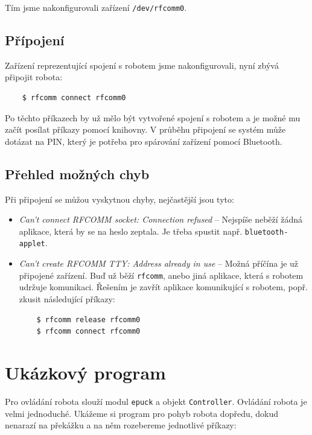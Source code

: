 \documentclass[12pt,notitlepage]{report}
\begin{document}
    Tím jsme nakonfigurovali zařízení {\tt /dev/rfcomm0}.

    \subsection{Přípojení}

    Zařízení reprezentující spojení s robotem jsme nakonfigurovali, nyní zbývá
    připojit robota:

    \begin{verbatim}
    $ rfcomm connect rfcomm0
    \end{verbatim}

    Po těchto příkazech by už mělo být vytvořené spojení s robotem a je možné
    mu začít posílat příkazy pomocí knihovny. V průběhu připojení se systém
    může dotázat na PIN, který je potřeba pro spárování zařízení pomocí
    Bluetooth.

    \subsection{Přehled možných chyb}
    Při připojení se můžou vyskytnou chyby, nejčastější jsou tyto:
    \begin{itemize}
    \item{{\em Can't connect RFCOMM socket: Connection refused} -- Nejspíše
        neběží žádná aplikace, která by se na heslo zeptala. Je třeba spustit
        např. {\tt bluetooth-applet}.}
    \item{{\em Can't create RFCOMM TTY: Address already in use} -- Možná
        příčína je už připojené zařízení. Buď už běží {\tt rfcomm}, anebo jiná
        aplikace, která s robotem udržuje komunikaci. Řešením je zavřít
        aplikace komunikující s robotem, popř. zkusit následující příkazy:
    \begin{verbatim}
    $ rfcomm release rfcomm0
    $ rfcomm connect rfcomm0
    \end{verbatim}
    }
    \end{itemize}

    \section{Ukázkový program}

    Pro ovládání robota slouží modul {\tt epuck} a objekt {\tt Controller}.
    Ovládání robota je velmi jednoduché. Ukážeme si program pro pohyb robota
    dopředu, dokud nenarazí na překážku a na něm rozebereme jednotlivé příkazy:
\end{document}
